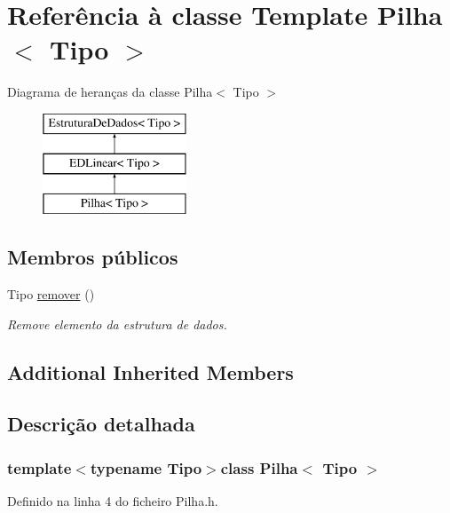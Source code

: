 \hypertarget{classPilha}{\section{Referência à classe Template Pilha$<$ Tipo $>$}
\label{classPilha}
}
Diagrama de heranças da classe Pilha$<$ Tipo $>$\begin{figure}[H]
\begin{center}
\leavevmode
\includegraphics[height=3.000000cm]{classPilha}
\end{center}
\end{figure}
\subsection*{Membros públicos}
\begin{DoxyCompactItemize}
\item 
Tipo \hyperlink{classPilha_a57d9edb93b911f91b4527f7ab365ef8c}{remover} ()
\begin{DoxyCompactList}\small\item\em Remove elemento da estrutura de dados. \end{DoxyCompactList}\end{DoxyCompactItemize}
\subsection*{Additional Inherited Members}


\subsection{Descrição detalhada}
\subsubsection*{template$<$typename Tipo$>$class Pilha$<$ Tipo $>$}



Definido na linha 4 do ficheiro Pilha.\-h.



